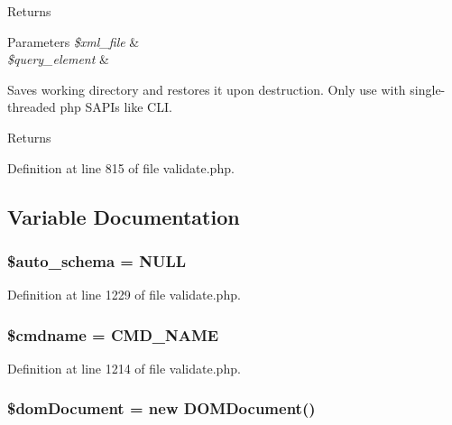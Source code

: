 \begin{DoxyReturn}{Returns}

\end{DoxyReturn}

\begin{DoxyParams}{Parameters}
{\em \$xml\+\_\+file} & \\
\hline
{\em \$query\+\_\+element} & \\
\hline
\end{DoxyParams}
Saves working directory and restores it upon destruction. Only use with single-\/threaded php S\+A\+P\+Is like C\+L\+I.

\begin{DoxyReturn}{Returns}



\end{DoxyReturn}


Definition at line 815 of file validate.\+php.



\subsection{Variable Documentation}
\hypertarget{validate_8php_aeb18ba5c86f2000ce5dd010acff58413}{
\subsubsection[{\$auto\+\_\+schema}]{\setlength{\rightskip}{0pt plus 5cm}\$auto\+\_\+schema = N\+U\+L\+L}}\label{validate_8php_aeb18ba5c86f2000ce5dd010acff58413}


Definition at line 1229 of file validate.\+php.

\hypertarget{validate_8php_a45b77e89b244f7f9d70aac2006151525}{
\subsubsection[{\$cmdname}]{\setlength{\rightskip}{0pt plus 5cm}\$cmdname = {\bf C\+M\+D\+\_\+\+N\+A\+M\+E}}}\label{validate_8php_a45b77e89b244f7f9d70aac2006151525}


Definition at line 1214 of file validate.\+php.

\hypertarget{validate_8php_a95b15eb9cb20bddf2214b8996fad3158}{
\subsubsection[{\$dom\+Document}]{\setlength{\rightskip}{0pt plus 5cm}\$dom\+Document = new D\+O\+M\+Document()}}\label{validate_8php_a95b15eb9cb20bddf2214b8996fad3158}


